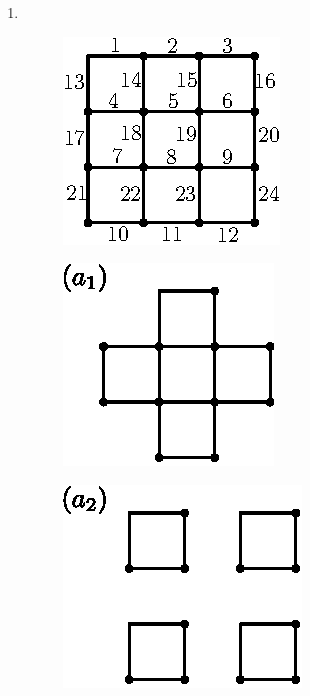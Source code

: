 \begin{enumerate}
\begin{figure}[H]
\hspace{4cm}
\end{figure}

\item 
~

\begin{figure}[H]
\centering
\includegraphics[scale=1.3]{images/chap11/ans8.eps}
\end{figure}


\begin{minipage}[c]{4cm}
\begin{figure}[H]
\centering
\includegraphics{images/chap11/ans8a1.eps}

\hspace{4cm}
\end{figure}
\end{minipage}
\qquad
\begin{minipage}[c]{5cm}
\begin{figure}[H]
\centering
\includegraphics{images/chap11/ans8a2.eps}


\end{figure}
\end{minipage}
\end{enumerate}
